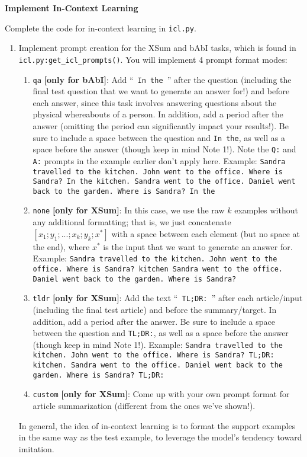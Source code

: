 \item {} {\bf Implement In-Context Learning}

Complete the code for in-context learning in \texttt{icl.py}.
\begin{enumerate}[label=(\roman*)]
    \item Implement prompt creation for the XSum and bAbI tasks, which is found in \texttt{icl.py:get\_icl\_prompts()}. You will implement 4 prompt format modes:
    \begin{enumerate}[label={\arabic*}]
        \item \texttt{qa} \textbf{[only for bAbI]}: Add ``\texttt{ In the }'' after the question (including the final test question that we want to generate an answer for!) and before each answer, since this task involves answering questions about the physical whereabouts of a person. In addition, add a period after the answer (omitting the period can significantly impact your results!). Be sure to include a space between the question and \texttt{In the}, as well as a space before the answer (though keep in mind Note 1!). Note the  \texttt{Q:} and \texttt{A:} prompts in the example earlier don't apply here. Example: \texttt{Sandra travelled to the kitchen. John went to the office. Where is Sandra? In the kitchen. Sandra went to the office. Daniel went back to the garden. Where is Sandra? In the}
        \item \texttt{none} \textbf{[only for XSum]}: In this case, we use the raw $k$ examples without any additional formatting; that is, we just concatenate $[x_1; y_1; ... ; \allowbreak x_k; y_k; x^*]$ with a space between each element (but no space at the end), where $x^*$ is the input that we want to generate an answer for. Example: \texttt{Sandra travelled to the kitchen. John went to the office. Where is Sandra? kitchen Sandra went to the office. Daniel went back to the garden. Where is Sandra?}
        \item \texttt{tldr} \textbf{[only for XSum]}: Add the text ``\texttt{ TL;DR: }'' after each article/input (including the final test article) and before the summary/target. In addition, add a period after the answer. Be sure to include a space between the question and \texttt{TL;DR:}, as well as a space before the answer (though keep in mind Note 1!). Example: \texttt{Sandra travelled to the kitchen. John went to the office. Where is Sandra? TL;DR: kitchen. Sandra went to the office. Daniel went back to the garden. Where is Sandra? TL;DR:}
        \item \texttt{custom} \textbf{[only for XSum]}: Come up with your own prompt format for article summarization (different from the ones we've shown!).
    \end{enumerate}
    In general, the idea of in-context learning is to format the support examples in the same way as the test example, to leverage the model's tendency toward imitation.


\end{enumerate}
